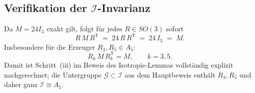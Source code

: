 \documentclass[11pt,a4paper]{article}
\begin{document}
\subsection{Verifikation der $\mathcal{I}$-Invarianz}

Da $M=24I_3$ exakt gilt, folgt für jedes $R\in SO(3)$ sofort
\[
  R\,M\,R^{\mathsf T}
  \;=\;
  24\,R\,R^{\mathsf T}
  \;=\;
  24\,I_3
  \;=\;
  M.
\]
Insbesondere für die Erzeuger $R_3,R_5\in A_5$:
\[
  R_k\,M\,R_k^{\mathsf T} = M,
  \qquad k=3,5.
\]
Damit ist Schritt~(iii) im Beweis des Isotropie-Lemmas vollständig explizit
nachgerechnet; die Untergruppe $\mathcal{G}\subset\mathcal{I}$ aus dem
Hauptbeweis enthält $R_3,R_5$ und daher ganz $\mathcal{I}\cong A_5$.
\end{document}
